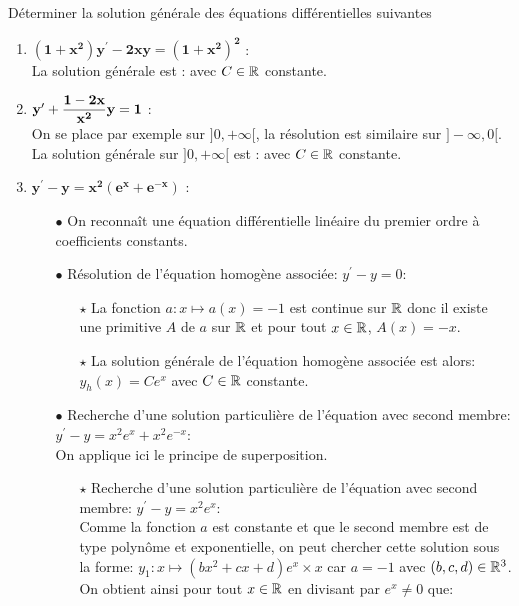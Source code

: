 \documentclass[a4paper, 11pt,reqno]{article}
\begin{document}
\begin{correction}   \;
D\'eterminer la solution g\'en\'erale des \'equations diff\'erentielles suivantes
\begin{enumerate}
 \item \textbf{$\mathbf{(1+x^2)y^{\prime}-2xy=(1+x^2)^2}$} :\\
La solution g\'en\'erale est :  avec $C\in\mathbb{R}$ constante.
\item \textbf{$\mathbf{y^{\prime}+ \displaystyle\frac{1-2x}{x^2} y=1}$} :\\
On se place par exemple sur $]0,+\infty[$, la r\'esolution est similaire sur $]-\infty,0[$.\\
La solution g\'en\'erale  sur $]0,+\infty[$ est :  avec $C\in\mathbb{R}$ constante.
\item \textbf{$\mathbf{y^{\prime}-y=x^2(e^x+e^{-x})}$} :\\
\begin{itemize}
\item[$\bullet$] On reconna\^{i}t une \'equation diff\'erentielle lin\'eaire du premier ordre \`{a} coefficients  constants.
\item[$\bullet$] R\'esolution de l'\'equation homog\`{e}ne associ\'ee: $y^{\prime}-y=0$:\\
\begin{itemize}
\item[$\star$] La fonction $a: x\mapsto a(x)=-1$ est continue sur $\mathbb{R}$ donc il existe une primitive $A$ de $a$ sur $\mathbb{R}$ et pour tout $x\in\mathbb{R}$, $A(x)=-x$.
\item[$\star$] La solution g\'en\'erale de l'\'equation homog\`{e}ne associ\'ee est alors: $y_h(x)= Ce^{x}$ avec $C\in\mathbb{R}$ constante.
\end{itemize}
\item[$\bullet$] Recherche d'une solution particuli\`{e}re de l'\'equation avec second membre: $y^{\prime}-y=x^2e^x+x^2e^{-x}$:\\
\noindent On applique ici le principe de superposition.
\begin{itemize}
\item[$\star$] Recherche d'une solution particuli\`{e}re de l'\'equation avec second membre: $y^{\prime}-y=x^2e^x$:\\
\noindent Comme la fonction $a$ est constante et que le second membre est de type polyn\^{o}me et exponentielle, on peut chercher cette solution sous la forme: $y_1: x\mapsto (bx^2+cx+d)e^x\times x$ car $a=-1$ avec $(b,c,d)\in\mathbb{R}^3$. On obtient ainsi pour tout $x\in\mathbb{R}$ en divisant par $e^x\not= 0$ que:\\ 

\end{itemize}
\end{itemize}
\end{enumerate}
\end{correction}
\end{document}
